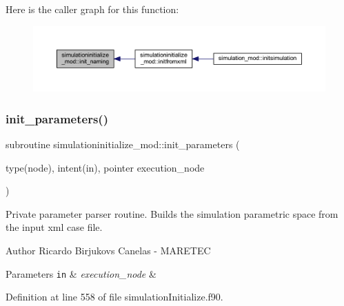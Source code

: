 Here is the caller graph for this function\+:\nopagebreak
\begin{figure}[H]
\begin{center}
\leavevmode
\includegraphics[width=350pt]{namespacesimulationinitialize__mod_a4909cc4cb57549e6eed3f69d6dfa30b5_icgraph}
\end{center}
\end{figure}
\mbox{\label{namespacesimulationinitialize__mod_a0b32e8c950fc615198d1e47ba1d36cd6}} 
\subsubsection{\texorpdfstring{init\+\_\+parameters()}{init\_parameters()}}
{\footnotesize\ttfamily subroutine simulationinitialize\+\_\+mod\+::init\+\_\+parameters (\begin{DoxyParamCaption}\item[{type(node), intent(in), pointer}]{execution\+\_\+node }\end{DoxyParamCaption})\hspace{0.3cm}{\ttfamily [private]}}



Private parameter parser routine. Builds the simulation parametric space from the input xml case file. 

\begin{DoxyAuthor}{Author}
Ricardo Birjukovs Canelas -\/ M\+A\+R\+E\+T\+EC 
\end{DoxyAuthor}

\begin{DoxyParams}[1]{Parameters}
\mbox{\tt in}  & {\em execution\+\_\+node} & \\
\hline
\end{DoxyParams}


Definition at line 558 of file simulation\+Initialize.\+f90.


